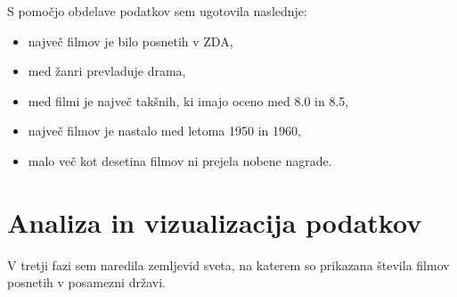 \documentclass[11pt,a4paper]{article}
\begin{document}
\null
\null
S pomočjo obdelave podatkov sem ugotovila naslednje:
\begin{itemize}
\item največ filmov je bilo posnetih v ZDA,
\item med žanri prevladuje drama,
\item med filmi je največ takšnih, ki imajo oceno med 8.0 in 8.5,
\item največ filmov je nastalo med letoma 1950 in 1960,
\item malo več kot desetina filmov ni prejela nobene nagrade.
\end{itemize}

 







\section{Analiza in vizualizacija podatkov}

V tretji fazi sem naredila zemljevid sveta, na katerem so prikazana števila filmov posnetih v posamezni državi.

\begin{figure}[H]

\end{figure}


\end{document}
